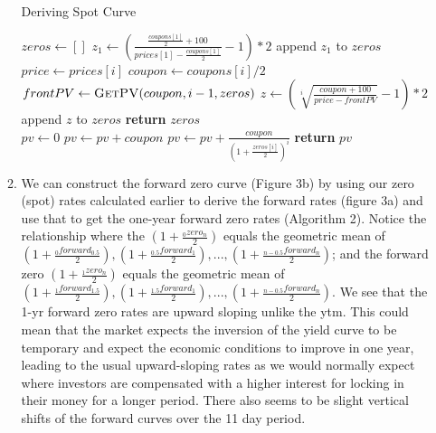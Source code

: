 \documentclass{article}
\begin{document}
\begin{enumerate}
\begin{enumerate}
            \begin{algorithm}[H]
              \caption{Deriving Spot Curve}\label{spot}
              \begin{algorithmic}[1]
                  \State $zeros\gets []$ 
                  \State $z_1\gets (\frac{\frac{coupons[1]}{2} + 100}{prices[1] - \frac{coupons[1]}{2}} - 1) * 2$ 
                  \State append $z_1$ to $zeros$
                   
                    \State $price \gets prices[i]$
                    \State $coupon \gets coupons[i] / 2$
                    \State $frontPV \gets \Call{GetPV}{coupon, i-1, zeros}$ 
                    \State $z \gets (\sqrt[i]{\frac{coupon + 100}{price - frontPV}} - 1) * 2$
                    \State append $z$ to $zeros$
                  \EndFor
                  \State \textbf{return} $zeros$
                \EndFunction
                \[\]
                    \State $pv \gets 0$
                    \State $pv \gets pv + coupon$
                     
                        \State $pv \gets pv + \frac{coupon}{(1 + \frac{zeros[i]}{2})^i}$
                    \EndFor
                    \State \textbf{return} $pv$
                \EndFunction
              \end{algorithmic}
            \end{algorithm}

        \item We can construct the forward zero curve \cite{chen2022forward} (Figure 3b) by using our zero (spot) rates calculated earlier to derive the forward rates (figure 3a) and use that to get the one-year forward zero rates (Algorithm 2). Notice the relationship where the $(1 + \frac{{}_{0}zero_n}{2})$ equals the geometric mean of $(1 + \frac{{}_{0}forward_{0.5}}{2}), (1 + \frac{{}_{0.5}forward_1}{2}), ..., (1 + \frac{{}_{n-0.5}forward_n}{2})$; and the forward zero $(1 + \frac{{}_{1}zero_n}{2})$ equals the geometric mean of $(1 + \frac{{}_{1}forward_{1.5}}{2}), (1 + \frac{{}_{1.5}forward_1}{2}), ..., (1 + \frac{{}_{n-0.5}forward_n}{2})$. We see that the 1-yr forward zero rates are upward sloping unlike the ytm. This could mean that the market expects the inversion of the yield curve to be temporary and expect the economic conditions to improve in one year, leading to the usual upward-sloping rates as we would normally expect where investors are compensated with a higher interest for locking in their money for a longer period. There also seems to be slight vertical shifts of the forward curves over the 11 day period.
        

\end{enumerate}
\end{enumerate}
\end{document}
